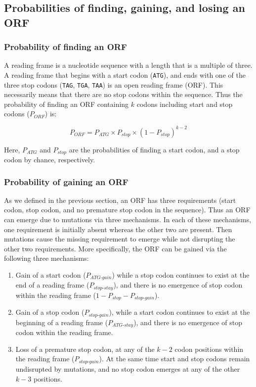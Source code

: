 \documentclass[12pt,a4paper]{article}
\begin{document}
\subsection{Probabilities of finding, gaining, and losing an ORF}

\label{methORF}

\subsubsection{Probability of finding an ORF}

A reading frame is a nucleotide sequence with a length that is a multiple of three. A reading frame that begins with a start codon (\texttt{ATG}), and ends with one of the three stop codons (\texttt{TAG}, \texttt{TGA}, \texttt{TAA}) is an open reading frame (ORF). This necessarily means that there are no stop codons within the sequence. Thus the probability of finding an ORF containing $k$ codons including start and stop codons ($P_\textit{ORF}$) is: 

\begin{equation}
P_\textit{ORF} = P_\textit{ATG} \times P_\textit{stop} \times (1 - P_\textit{stop})^{k-2}
\label{eqorfprob}
\end{equation}

Here, $P_\textit{ATG}$ and $P_\textit{stop}$ are the probabilities of finding a start codon, and a stop codon by chance, respectively.

\subsubsection{Probability of gaining an ORF}

As we defined in the previous section, an ORF has three requirements (start codon, stop codon, and no premature stop codon in the sequence). Thus an ORF can emerge due to mutations via three mechanisms. In each of these mechanisms, one requirement is initially absent whereas the other two are present. Then mutations cause the missing requirement to emerge while not disrupting the other two requirements. More specifically, the ORF can be gained via the following three mechanisms:
\begin{enumerate}
\item Gain of a start codon ($P_\textit{ATG-gain}$) while a stop codon continues to exist at the end of a reading frame ($P_\textit{stop-stay}$), and there is no emergence of stop codon within the reading frame ($1- P_\textit{stop} - P_\textit{stop-gain}$).
\item Gain of a stop codon ($P_\textit{stop-gain}$), while a start codon continues to exist at the beginning of a reading frame ($P_\textit{ATG-stay}$), and there is no emergence of stop codon within the reading frame.
\item Loss of a premature stop codon, at any of the $k-2$ codon positions within the reading frame ($P_\textit{stop-gain}$). At the same time start and stop codons remain undisrupted by mutations, and no stop codon emerges at any of the other $k-3$ positions.
\end{enumerate} 
\end{document}
